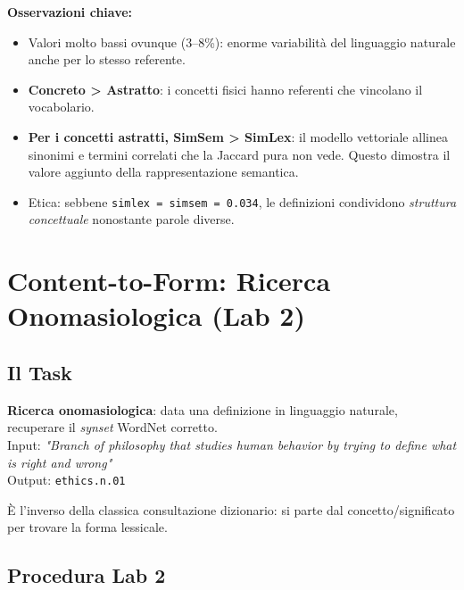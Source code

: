 \documentclass[12pt,a4paper]{article}
\begin{document}
\textbf{Osservazioni chiave:}
\begin{itemize}
  \item Valori molto bassi ovunque (3--8\%): enorme variabilit\`a del linguaggio naturale anche per lo stesso referente.
  \item \textbf{Concreto > Astratto}: i concetti fisici hanno referenti che vincolano il vocabolario.
  \item \textbf{Per i concetti astratti, SimSem > SimLex}: il modello vettoriale allinea sinonimi e termini correlati che la Jaccard pura non vede. Questo dimostra il valore aggiunto della rappresentazione semantica.
  \item Etica: sebbene \texttt{simlex = simsem = 0.034}, le definizioni condividono \emph{struttura concettuale} nonostante parole diverse.
\end{itemize}

\section{Content-to-Form: Ricerca Onomasiologica (Lab 2)}

\subsection{Il Task}\label{sec:lab2-impl}

\begin{defbox}
\textbf{Ricerca onomasiologica}: data una definizione in linguaggio naturale, recuperare il \emph{synset} WordNet corretto.\\[4pt]
Input: \textit{"Branch of philosophy that studies human behavior by trying to define what is right and wrong"} \\
Output: \texttt{ethics.n.01}
\end{defbox}

\`E l'inverso della classica consultazione dizionario: si parte dal concetto/significato per trovare la forma lessicale.

\subsection{Procedura Lab 2}
\end{document}
